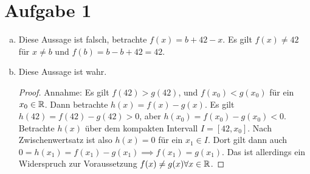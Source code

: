 \documentclass{article}
\begin{document}
    \section*{Aufgabe 1}
    \begin{enumerate}[(a)]
        \item Diese Aussage ist falsch, betrachte $f(x) = b+ 42 -x$. Es gilt $f(x) \neq 42$ für $x \neq b$ und $f(b) = b-b + 42 = 42$.
        \item Diese Aussage ist wahr.
        \begin{proof}
            Annahme: Es gilt $f(42) > g(42)$, und $f(x_0) < g(x_0)$ für ein $x_0\in \mathbb{R}$.
            Dann betrachte $h(x) = f(x) - g(x)$. Es gilt $h(42) = f(42) - g(42) > 0$, aber $h(x_0) = f(x_0) - g(x_0) < 0$. Betrachte $h(x)$ über dem kompakten Intervall $I = [42, x_0]$. Nach Zwischenwertsatz ist also $h(x) = 0$ für ein $x_1\in I$. Dort gilt dann auch $0 = h(x_1) = f(x_1)- g(x_1)\implies f(x_1) = g(x_1)$. Das ist allerdings ein Widerspruch zur Voraussetzung $f(x) \neq g(x) \forall x \in \mathbb{R}$.
            \end{proof}
    \end{enumerate}
\end{document}
